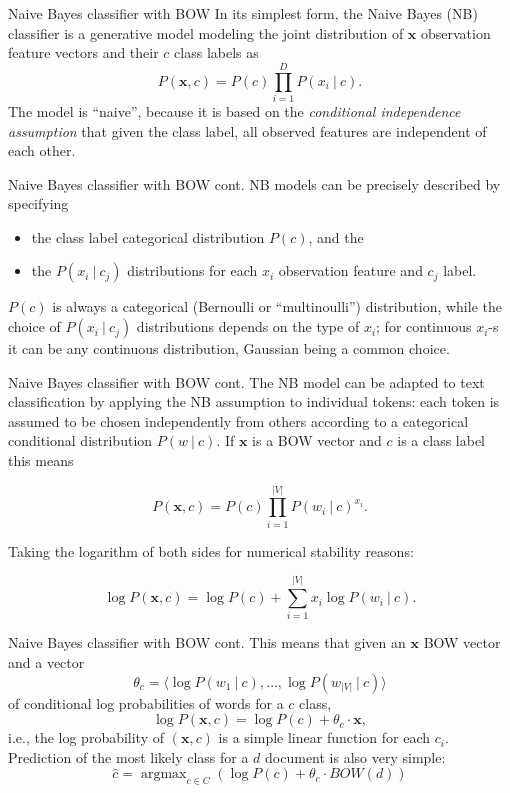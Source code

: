 \documentclass[style=upen, size=14pt]{powerdot}
\DeclareMathOperator*{\argmax}{argmax}
\theoremstyle{definition}
\begin{document}
 \begin{slide}[toc=Naive Bayes]{Naive Bayes classifier with BOW}
   In its simplest form, the Naive Bayes (NB) classifier is a generative model
   modeling the joint distribution of $\mathbf{x}$ observation feature vectors
   and their $c$ class labels as
   $$
   P(\mathbf{x}, c) = P(c)\prod_{i=1}^D P(x_i~\vert~c).
   $$
   The model is ``naive'', because it is based on the \emph{conditional
     independence assumption} that given the class label, all observed features
   are independent of each other.
 \end{slide}

 \begin{slide}[toc=]{Naive Bayes classifier with BOW cont.}
   NB models can be precisely described by specifying
   \begin{itemize}
   \item the class label categorical distribution $P(c)$, and the
   \item the $P(x_i~\vert~ c_j)$ distributions for each $x_i$ observation
     feature and $c_j$ label.
   \end{itemize}
   $P(c)$ is always a categorical (Bernoulli or ``multinoulli'') distribution,
   while the choice of $P(x_i~\vert~ c_j)$ distributions depends on the type of
   $x_i$; for continuous $x_i$-s it can be any continuous distribution,
   Gaussian being a common choice.
 \end{slide}

 \begin{slide}[toc=]{Naive Bayes classifier with BOW cont.}
   The NB model can be adapted to text classification by applying the NB
   assumption to individual tokens: each token is assumed to be chosen
   independently from others according to a categorical conditional distribution
   $P(w ~|~ c)$. If $\mathbf{x}$ is a BOW vector and $c$ is a class label this
   means
   \begin{small}
   $$
   P(\mathbf{x}, c) = P(c) \prod_{i=1}^{|V|}P(w_i~\vert~c)^{x_i}.
   $$
   \end{small}
     Taking the logarithm of both sides for numerical stability reasons:
   \begin{small}
   $$
   \log P(\mathbf{x}, c) = \log P(c) + \sum_{i=1}^{|V|}x_i \log P(w_i~\vert~c).
   $$
   \end{small}
 \end{slide}

 \begin{slide}[toc=]{Naive Bayes classifier with BOW cont.}
   This means that given an $\mathbf{x}$ BOW vector and a vector
   $$\theta_c=\langle \log P(w_1~\vert~c),\dots,\log P(w_{|V|}~\vert~c) \rangle$$
   of conditional log probabilities of words for a $c$ class,
   $$\log P(\mathbf{x}, c) = \log P(c) +  \theta_c \cdot \mathbf{x},$$
   i.e., the log probability of $(\mathbf{x}, c)$ is a simple linear function
   for each $c_i$. Prediction of the most likely class for a $d$ document is also
   very simple:
   $$
   \hat c = \argmax_{c\in C}(\log P(c) + \theta_{c}  \cdot BOW(d) )
   $$
 \end{slide}
\end{document}

